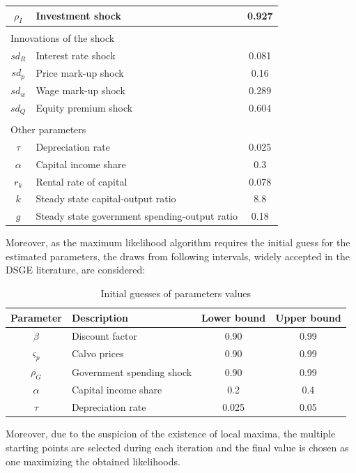 \documentclass{pracamgr}
\numberwithin{equation}{section}
\begin{document}
\begin{table}[H]
{\begin{tabular}{@{}| c | l | c |@{}}
$\rho_I$ & Investment shock & 0.927 \\
\midrule
\multicolumn{3}{l}{}  \\
\multicolumn{3}{l}{Innovations of the shock} \\
\midrule
$sd_R$ & Interest rate shock & 0.081 \\
$sd_p$ & Price mark-up shock & 0.16 \\
$sd_w$ & Wage mark-up shock & 0.289 \\
$sd_Q$ & Equity premium shock & 0.604 \\
\midrule
\multicolumn{3}{l}{}  \\
\multicolumn{3}{l}{Other parameters} \\
\midrule
$\tau$ & Depreciation rate & 0.025 \\
$\alpha$ & Capital income share & 0.3 \\
$r_k$ & Rental rate of capital & 0.078 \\
$k$ & Steady state capital-output ratio & 8.8 \\
$g$ & Steady state government spending-output ratio & 0.18 \\
\bottomrule
\end{tabular}}
\end{table}

Moreover, as the maximum likelihood algorithm requires the initial guess for the estimated parameters, the draws from following intervals, widely accepted in the DSGE literature, are considered:

\begin{table}[H]
\centering
\caption[Intervals for initial guess of parameters values]{Initial guesses of parameters values}
    \label{Initial_par_values}
\begin{tabular}{@{}| c | l | c | c |@{}}
\toprule
Parameter & Description & Lower bound & Upper bound \\
\midrule
$\beta$ & Discount factor & 0.90 & 0.99 \\
$\varsigma_{p}$ & Calvo prices & 0.90 & 0.99 \\
$\rho_G$ & Government spending shock & 0.90 & 0.99 \\
$\alpha$ & Capital income share & 0.2 & 0.4 \\
$\tau$ & Depreciation rate & 0.025 & 0.05 \\
\bottomrule
\end{tabular}
\end{table}

Moreover, due to the suspicion of the existence of local maxima, the multiple starting points are selected during each iteration and the final value is chosen as one maximizing the obtained likelihoods.
\end{document}
